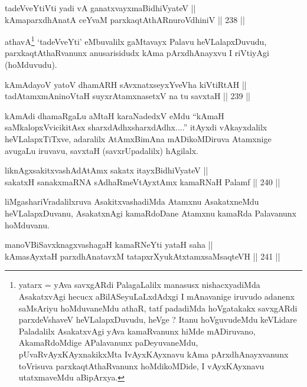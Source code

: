 
\begin{shl}
tadeVveYtiVti yadi vA ganatxvayxmaBidhiVyateV || \\
kAmaparxdhAnatA ceYvaM parxkaqtAthARnuroVdhiniV ||  238 ||  
\end{shl}

\begin{artha}
athavA\footnote{yatarx = yAva savxgARdi PalagaLalilx manasusx
nishacxyadiMda AsakatxvAgi hecucx aBilASeyuLaLxdAdxgi I mAnavanige
iruvudo adanenx saMsAriyu hoMduvaneMdu athaR, tatf padadiMda
hoVgatakakx savxgARdi parxdeVshaveV heVLalapxDuvudu, heVge ? Itanu
hoVguvudeMdu keVLidare Paladalilx AsakatxvAgi yAva kamaRvanunx hiMde
mADiruvano, AkamaRdoMdige APalavanunx paDeyuvaneMdu,
pUvaRvAyxKAyxnakikxMta IvAyxKAyxnavu kAma pArxdhAnayxvanunx
toVrisuva parxkaqtAthaRvanunx hoMdikoMDide, I vAyxKAyxnavu
utatxmaveMdu aBipArxya.} `tadeVveYti' eMbuvalilx gaMtavayx Palavu
heVLalapxDuvudu, parxkaqtAthaRvanunx anusarisidudx kAma pArxdhAnayxvu
I riVtiyAgi (hoMduvudu).
\end{artha}

\begin{shl}
kAmAdayoV yatoV dhamARH sAvxnatxseyxYveVha kiVtiRtAH || \\
tadAtamxmAninoV\s taH suyxrAtamxnasetxV na tu savxtaH ||  239 ||  
\end{shl}

\begin{artha}
kAmAdi dhamaRgaLu aMtaH karaNadedxV eMdu ``kAmaH saMkalopxVvicikitAsx
sharxdAdhx\s sharxdAdhx....'' itAyxdi vAkayxdalilx heVLalapxTiTxve,
adaralilx AtAmxBimAna mADikoMDiruva Atamxnige avugaLu iruvavu, savxtaH
(savxrUpadalilx) hAgilalx.
\end{artha}

\begin{shl}
liknAgxsakitxvashAdAtAmx sakatx itayxBidhiVyateV || \\
sakatxH sanakxmaRNA sAdhaRmeVtAyxtAmx kamaRNaH Palamf ||  240 ||  
\end{shl}

\begin{artha}
liMgashariVradalilxruva AsakitxvashadiMda Atamxnu AsakatxneMdu
heVLalapxDuvanu, AsakatxnAgi kamaRdoDane Atamxnu kamaRda Palavanunx
hoMduvanu.
\end{artha}

\begin{shl}
manoVBiSavxknagxvashagaH kamaRNeYti yataH saha || \\
kAmasAyxtaH parxdhAnatavxM tatapxrXyukAtxtamxsaMsaqteVH ||  241 ||  
\end{shl}

